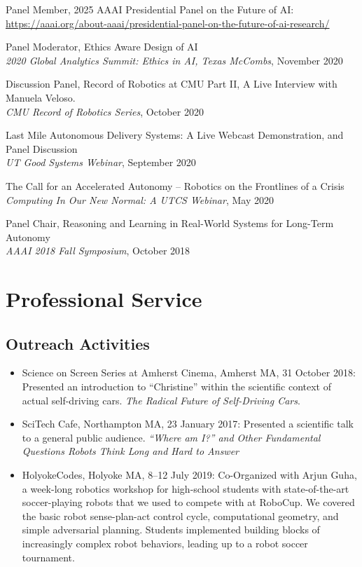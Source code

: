 \documentclass[Times]{article}
\begin{document}
Panel Member, 2025 AAAI Presidential Panel on the Future of AI:
\url{https://aaai.org/about-aaai/presidential-panel-on-the-future-of-ai-research/} 

Panel Moderator, Ethics Aware Design of AI\\
{\em 2020 Global Analytics Summit: Ethics in AI, Texas McCombs}, November 2020

Discussion Panel, Record of Robotics at CMU Part II, A Live Interview with
Manuela Veloso.\\
{\em CMU Record of Robotics Series}, October 2020

Last Mile Autonomous Delivery Systems: A Live Webcast Demonstration, and Panel Discussion\\
{\em UT Good Systems Webinar}, September 2020

The Call for an Accelerated Autonomy -- Robotics on the Frontlines of a Crisis\\
{\em Computing In Our New Normal: A UTCS Webinar}, May 2020

Panel Chair, Reasoning and Learning in Real-World Systems for Long-Term
Autonomy\\
{\em AAAI 2018 Fall Symposium}, October 2018

\section*{Professional Service}

\subsection*{Outreach Activities}
\begin{itemize}
\item Science on Screen Series at Amherst Cinema, Amherst MA, 31 October 2018:
Presented an introduction to ``Christine'' within the scientific context of
actual self-driving cars. \emph{The Radical Future of Self-Driving Cars}.
\item SciTech Cafe, Northampton MA, 23 January 2017: Presented a scientific talk
to a general public audience. \emph{``Where am I?'' and
  Other Fundamental Questions Robots Think Long and Hard to Answer}
\item HolyokeCodes, Holyoke MA, 8--12 July 2019: Co-Organized with Arjun Guha, a week-long
robotics workshop for high-school students with state-of-the-art soccer-playing
robots that we used to compete with at RoboCup. We
covered the basic robot sense-plan-act control cycle, computational geometry,
and simple adversarial planning. Students implemented building blocks of
increasingly complex robot behaviors, leading up to a robot soccer tournament.
\end{itemize}
\end{document}
